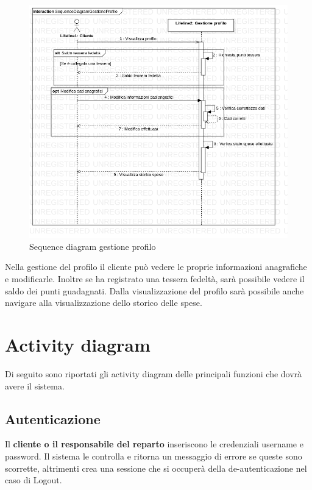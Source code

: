 \documentclass[12pt, a4paper]{report}
\begin{document}
\begin{figure}[h]
  \centering
  \includegraphics[width=\textwidth]{Use Case Model!Gestione profilo!InteractionGestioneProfilo!SequenceDiagramGestioneProfilo_5.png}
  \caption{Sequence diagram gestione profilo}
\end{figure}

Nella gestione del profilo il cliente può vedere le proprie informazioni 
anagrafiche e modificarle. Inoltre se ha registrato una tessera fedeltà, sarà
possibile vedere il saldo dei punti guadagnati. Dalla visualizzazione del 
profilo sarà possibile anche navigare alla visualizzazione dello storico delle
spese.

\newpage

\section{Activity diagram}
Di seguito sono riportati gli activity diagram delle principali funzioni che 
dovrà avere il sistema.

\subsection{Autenticazione}

Il \textbf{cliente o il responsabile del reparto} inseriscono le credenziali username e password.
Il sistema le controlla e ritorna un messaggio di errore se queste sono scorrette, altrimenti crea una sessione che si occuperà della de-autenticazione nel caso di Logout.
\end{document}

